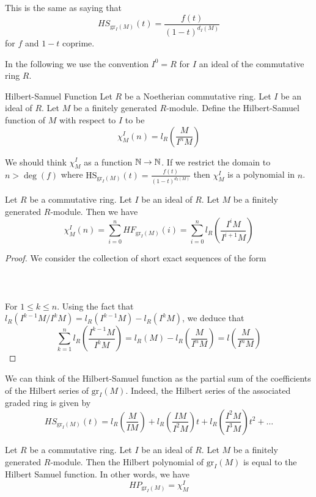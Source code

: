\documentclass[a4paper]{article}
\begin{document}
This is the same as saying that $$HS_{\text{gr}_I(M)}(t)=\frac{f(t)}{(1-t)^{d_I(M)}}$$ for $f$ and $1-t$ coprime. 

In the following we use the convention $I^0=R$ for $I$ an ideal of the commutative ring $R$. 

\begin{defn}{Hilbert-Samuel Function}{} Let $R$ be a Noetherian commutative ring. Let $I$ be an ideal of $R$. Let $M$ be a finitely generated $R$-module. Define the Hilbert-Samuel function of $M$ with respect to $I$ to be $$\chi_M^I(n)=l_R\left(\frac{M}{I^nM}\right)$$
\end{defn}

We should think $\chi_M^I$ as a function $\mathbb{N}\to\mathbb{N}$. If we restrict the domain to $n>\deg(f)$ where $\text{HS}_{\text{gr}_I(M)}(t)=\frac{f(t)}{(1-t)^{d_I(M)}}$ then $\chi_M^I$ is a polynomial in $n$. 

\begin{prp}{}{} Let $R$ be a commutative ring. Let $I$ be an ideal of $R$. Let $M$ be a finitely generated $R$-module. Then we have $$\chi_M^I(n)=\sum_{i=0}^nHF_{\text{gr}_I(M)}(i)=\sum_{i=0}^nl_R\left(\frac{I^iM}{I^{i+1}M}\right)$$ 
\begin{proof}
We consider the collection of short exact sequences of the form \\~\\
 \\~\\
For $1\leq k\leq n$. Using the fact that $l_R(I^{k-1}M/I^kM)=l_R(I^{k-1}M)-l_R(I^kM)$, we deduce that $$\sum_{k=1}^nl_R\left(\frac{I^{k-1}M}{I^kM}\right)=l_R(M)-l_R\left(\frac{M}{I^nM}\right)=l\left(\frac{M}{I^nM}\right)$$
\end{proof}
\end{prp}

We can think of the Hilbert-Samuel function as the partial sum of the coefficients of the Hilbert series of $\text{gr}_I(M)$. Indeed, the Hilbert series of the associated graded ring is given by $$HS_{\text{gr}_I(M)}(t)=l_R\left(\frac{M}{IM}\right)+l_R\left(\frac{IM}{I^2M}\right)t+l_R\left(\frac{I^2M}{I^3M}\right)t^2+\dots$$

\begin{prp}{}{} Let $R$ be a commutative ring. Let $I$ be an ideal of $R$. Let $M$ be a finitely generated $R$-module. Then the Hilbert polynomial of $\text{gr}_I(M)$ is equal to the Hilbert Samuel function. In other words, we have $$HP_{\text{gr}_I(M)}=\chi_M^I$$
\end{prp}
\end{document}
